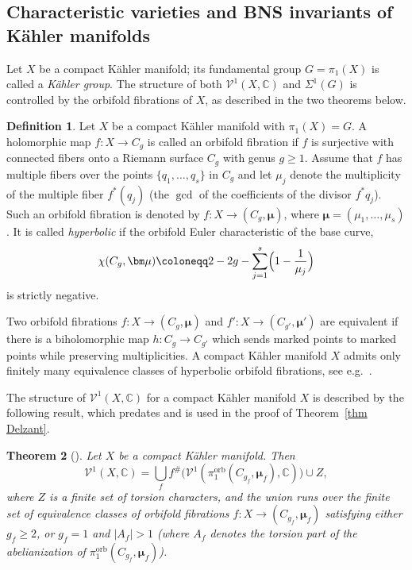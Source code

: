 \documentclass[11pt]{amsart}
\newtheorem{theorem}{Theorem}[section]
\theoremstyle{definition}
\newtheorem{definition}[theorem]{Definition}
\newcommand{\C}{\mathbb{C}}
\newcommand{\VV}{\mathcal{V}}
\DeclareMathOperator{\orb}{orb}
\newcommand{\abs}[1]{\left| #1 \right|}
\begin{document}
\subsection{Characteristic varieties and BNS invariants 
of K\"{a}hler manifolds}
\label{subsc:cv-bns-kahler}

Let $X$ be a compact K\"{a}hler manifold; its fundamental 
group $G = \pi_1(X)$ is called a \emph{K\"{a}hler group}. 
The structure of both $\VV^1(X,\C)$ and $\Sigma^1(G)$ is 
controlled by the orbifold fibrations of $X$, as described 
in the two theorems below.

\begin{definition}
\label{def:orbi-fibration}
Let $X$ be a compact K\"ahler manifold with $\pi_1(X)=G$. A holomorphic map 
$f\colon X \to C_{g}$ is called an orbifold fibration if $f$ is surjective with connected 
fibers onto a Riemann surface $C_g$ with genus $g\geqslant 1$. Assume that $f$ 
has multiple fibers over the points  $\{q_1,\ldots,q_s\}$ in $C_g$ and let $\mu_j$ 
denote the multiplicity of the multiple fiber $f^{*}(q_j)$ (the $\gcd$ of the coefficients 
of the divisor $f^* q_j$). 
Such an orbifold fibration is denoted by $f\colon X \to (C_{g},{\bm \mu})$, 
where ${\bm \mu}=(\mu_1,\ldots,\mu_s)$. It is called {\em hyperbolic} if 
the orbifold Euler characteristic of the base curve, 
\[
\chi(C_{g},{\bm \mu}) \coloneqq 2-2g- \sum_{j=1}^s \Bigl(1-\frac{1}{\mu_j}\Bigr)
\]
is strictly negative.
\end{definition}

Two orbifold fibrations $f\colon X \to (C_{g},{\bm \mu})$ and 
$f'\colon X \to (C_{g'},{\bm \mu}')$  are equivalent
if there is a biholomorphic map $h\colon C_g \to C_{g'}$ which 
sends marked points to marked
points while preserving multiplicities. A compact K\"ahler
manifold $X$ admits only finitely many equivalence classes 
of hyperbolic orbifold fibrations, see e.g.~\cite[Thm.~2]{De08}.

The structure of $\VV^1(X,\C)$ for a compact K\"{a}hler 
manifold $X$ is described by the following result, which 
predates and is used in the proof of Theorem~\ref{thm Delzant}.

\begin{theorem}[\cite{Be92, Arapura, Cm01, Di07, De08, Cm11, ACM,DPS-duke, GL91}]
\label{thm:cv1-kahler}
Let $X$ be a compact K\"{a}hler manifold. Then
\begin{equation}
\label{eq:cv1-kahler}
\VV^1(X,\C) = \bigcup_{f} f^\#\big(\VV^1(\pi_1^{\orb}
(C_{g_f}, \bm{\mu}_f),\C)\big) \cup Z,
\end{equation}
where $Z$ is a finite set of torsion characters, and the 
union runs over the finite set of equivalence classes of 
orbifold fibrations $f\colon X\to (C_{g_f},\bm{\mu}_f)$ 
satisfying either $g_f\geq 2$, or $g_f=1$ and $\abs{A_f} >1$ 
(where $A_f$ denotes the torsion part of the abelianization 
of $\pi_1^{\orb}(C_{g_f}, \bm{\mu}_f)$).
\end{theorem}
\end{document}
